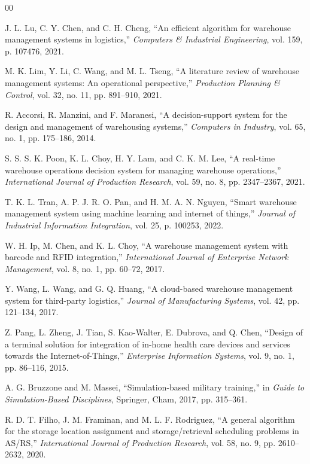 \documentclass[conference]{IEEEtran}
\begin{document}
\begin{thebibliography}{00}

J. L. Lu, C. Y. Chen, and C. H. Cheng, ``An efficient algorithm for warehouse management systems in logistics,'' \textit{Computers \& Industrial Engineering}, vol. 159, p. 107476, 2021.

M. K. Lim, Y. Li, C. Wang, and M. L. Tseng, ``A literature review of warehouse management systems: An operational perspective,'' \textit{Production Planning \& Control}, vol. 32, no. 11, pp. 891--910, 2021.

R. Accorsi, R. Manzini, and F. Maranesi, ``A decision-support system for the design and management of warehousing systems,'' \textit{Computers in Industry}, vol. 65, no. 1, pp. 175--186, 2014.

S. S. S. K. Poon, K. L. Choy, H. Y. Lam, and C. K. M. Lee, ``A real-time warehouse operations decision system for managing warehouse operations,'' \textit{International Journal of Production Research}, vol. 59, no. 8, pp. 2347--2367, 2021.

T. K. L. Tran, A. P. J. R. O. Pan, and H. M. A. N. Nguyen, ``Smart warehouse management system using machine learning and internet of things,'' \textit{Journal of Industrial Information Integration}, vol. 25, p. 100253, 2022.

W. H. Ip, M. Chen, and K. L. Choy, ``A warehouse management system with barcode and RFID integration,'' \textit{International Journal of Enterprise Network Management}, vol. 8, no. 1, pp. 60--72, 2017.

Y. Wang, L. Wang, and G. Q. Huang, ``A cloud-based warehouse management system for third-party logistics,'' \textit{Journal of Manufacturing Systems}, vol. 42, pp. 121--134, 2017.

Z. Pang, L. Zheng, J. Tian, S. Kao-Walter, E. Dubrova, and Q. Chen, ``Design of a terminal solution for integration of in-home health care devices and services towards the Internet-of-Things,'' \textit{Enterprise Information Systems}, vol. 9, no. 1, pp. 86--116, 2015.

A. G. Bruzzone and M. Massei, ``Simulation-based military training,'' in \textit{Guide to Simulation-Based Disciplines}, Springer, Cham, 2017, pp. 315--361.

R. D. T. Filho, J. M. Framinan, and M. L. F. Rodriguez, ``A general algorithm for the storage location assignment and storage/retrieval scheduling problems in AS/RS,'' \textit{International Journal of Production Research}, vol. 58, no. 9, pp. 2610--2632, 2020.

\end{thebibliography}
\end{document}
